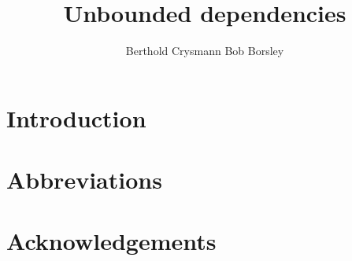 \documentclass[output=paper]{langsci/langscibook}
\author{%
	Berthold Crysmann\affiliation{Université Paris Diderot}%
	\lastand Bob Borsley\affiliation{University of Essex}%
}
\title{Unbounded dependencies}
\begin{document}
\label{chap-udc}\label{chap-nld}

\section{Introduction} 



 
\section*{Abbreviations}
\section*{Acknowledgements}

\printbibliography[heading=subbibliography,notkeyword=this] 
\end{document}
